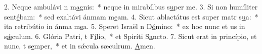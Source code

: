 2. Neque ambulávi n m\uline{a}gnis:~* neque in mirabílbus s\uline{u}per me.
3. Si non humíliter sent\uline{é}bam:~* sed exaltávi ánmam m\uline{e}am.
4. Sicut ablactátus est super matr s\uline{u}a:~* ita retribútio in ánma m\uline{e}a.
5. Speret Israël n D\uline{ó}mino:~* ex hoc nunc et us in s\uline{ǽ}culum.
6. Glória Patri, t F\uline{í}lio,~* et Spiríti S\uline{a}ncto.
7. Sicut erat in princípio, et nunc, t s\uline{e}mper,~* et in sǽcula sæculrum. \uline{A}men.
